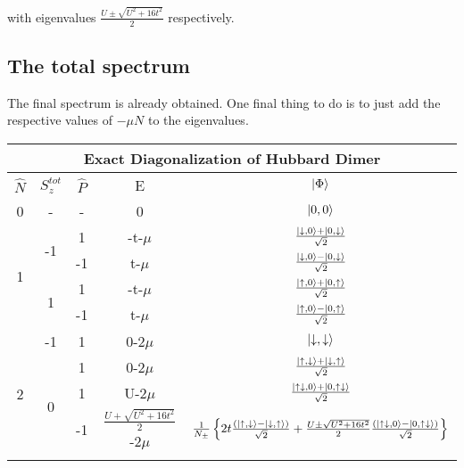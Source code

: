 \documentclass[12pt]{article}
\begin{document}
with eigenvalues \(\frac{U\pm\sqrt{U^2+16 t^2}}{2}\) respectively.
\subsection{The total spectrum}
The final spectrum is already obtained. One final thing to do is to just add the respective values of \(-\mu N\) to the eigenvalues.
\begin{table}[htb]
\begin{center}
\begin{tabular}{@{}ccccc@{}}
\toprule
\multicolumn{5}{c}{\bf{Exact Diagonalization of Hubbard Dimer}} \\
\toprule
\(\hat{N}\) & \(S_z^{tot}\) & \(\hat{P}\) & E & \(\ket{\Phi}\)\\
\toprule
0 & - & - & 0 & \(\ket{0,0}\) \\ \toprule
\multicolumn{1}{c}{\multirow{4}{*}{1}} & \multirow{2}{*}{-1} & 1  & -t-\(\mu\)  & \(\frac{\ket{\downarrow,0}+\ket{0,\downarrow}}{\sqrt{2}}\)  \\ \cmidrule(l){3-5} 
\multicolumn{1}{c}{}                   &                     & -1 & t-\(\mu\)   & \(\frac{\ket{\downarrow,0}-\ket{0,\downarrow}}{\sqrt{2}}\)  \\ \cmidrule(l){2-5}
\multicolumn{1}{c}{}                   & \multirow{2}{*}{1}  & 1  & -t-\(\mu\)  & \(\frac{\ket{\uparrow,0}+\ket{0,\uparrow}}{\sqrt{2}}\)  \\ \cmidrule(l){3-5} 
\multicolumn{1}{c}{}                   &                     & -1 & t-\(\mu\)   & \(\frac{\ket{\uparrow,0}-\ket{0,\uparrow}}{\sqrt{2}}\)  \\ \toprule
\multirow{6}{*}{2}                     & -1                  & 1  & 0-\(2\mu\)   & \(\ket{\downarrow,\downarrow}\)  \\ \cmidrule(l){2-5} 
                                       & \multirow{4}{*}{0}  & 1  & 0-\(2\mu\)   & \(\frac{\ket{\uparrow,\downarrow}+\ket{\downarrow,\uparrow}}{\sqrt{2}}\)  \\ \cmidrule(l){3-5} 
                                       &                     & 1  & U-\(2\mu\)   & \(\frac{\ket{\uparrow\downarrow,0}+\ket{0,\uparrow\downarrow}}{\sqrt{2}}\)  \\ \cmidrule(l){3-5} 
                                       &                     & -1 & \(\frac{U+\sqrt{U^2+16 t^2}}{2}\)-\(2\mu\)    & \(\frac{1}{N_\pm}\left\{{2t \frac{(\ket{\uparrow,\downarrow}-\ket{\downarrow,\uparrow})}{\sqrt{2}} + \frac{U\pm\sqrt{U^2+16 t^2}}{2} \frac{(\ket{\uparrow\downarrow,0}-\ket{0,\uparrow\downarrow})}{\sqrt{2}}}\right\}\)  \\ \cmidrule(l){3-5} 

\end{tabular}
\end{center}
\end{table}
\end{document}
